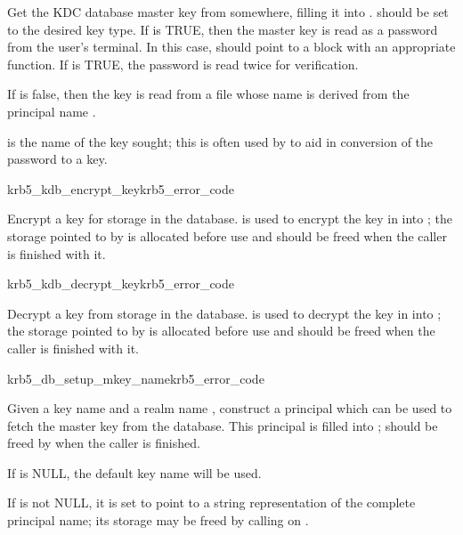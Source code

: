 Get the KDC database master key from somewhere, filling it into
. 
 should be set to the desired key type.
If  is TRUE, then the master key is read as a password
from the user's terminal.  In this case,
 should point to a block with an appropriate
  function.
If  is TRUE, the password is read twice for verification.

If  is false, then the key is read from
a file whose name is derived from the principal name .

 is the name of the key sought; this is often used by
 to aid in conversion of the password to a key. 

\begin{funcdecl}{krb5_kdb_encrypt_key}{krb5_error_code}{\funcin}
\funcinout
{}
\end{funcdecl}

Encrypt a key for storage in the database.   is used
to encrypt the key in  into ; the storage
pointed to by  is allocated before use and should be
freed when the caller is finished with it.

\begin{funcdecl}{krb5_kdb_decrypt_key}{krb5_error_code}{\funcin}
\funcinout
{}
\end{funcdecl}

Decrypt a key from storage in the database.   is used
to decrypt the key in  into ; the storage
pointed to by  is allocated before use and should be
freed when the caller is finished with it.

\begin{funcdecl}{krb5_db_setup_mkey_name}{krb5_error_code}{\funcin}
\funcout
{}
\end{funcdecl}

Given a key name  and a realm name ,
construct a principal which can be used to fetch the master key from the
database.  This principal is filled into ;
 should be freed by 
when the caller is finished.

If  is NULL, the default key name will be used.

If  is not NULL, it is set to point to a string
representation of the complete principal name; its storage may be freed
by calling  on .

